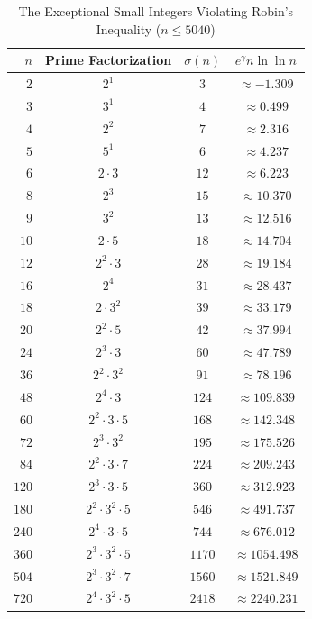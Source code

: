 \documentclass[11pt,a4paper]{article}
\theoremstyle{definition}
\begin{document}
\begin{table}[ht]
\centering
\small
\caption{The Exceptional Small Integers Violating Robin's Inequality ($n \le 5040$)}
\label{tab:robin_exceptions}
\vspace{0.5em}
\begin{tabular}{@{}rccc@{}}
\toprule
$n$ & Prime Factorization & $\sigma(n)$ & $e^\gamma n \ln\ln n$ \\
\midrule
$2$ & $2^1$ & $3$ & $\approx -1.309$ \\
$3$ & $3^1$ & $4$ & $\approx 0.499$ \\
$4$ & $2^2$ & $7$ & $\approx 2.316$ \\
$5$ & $5^1$ & $6$ & $\approx 4.237$ \\
$6$ & $2 \cdot 3$ & $12$ & $\approx 6.223$ \\
$8$ & $2^3$ & $15$ & $\approx 10.370$ \\
$9$ & $3^2$ & $13$ & $\approx 12.516$ \\
$10$ & $2 \cdot 5$ & $18$ & $\approx 14.704$ \\
$12$ & $2^2 \cdot 3$ & $28$ & $\approx 19.184$ \\
$16$ & $2^4$ & $31$ & $\approx 28.437$ \\
$18$ & $2 \cdot 3^2$ & $39$ & $\approx 33.179$ \\
$20$ & $2^2 \cdot 5$ & $42$ & $\approx 37.994$ \\
$24$ & $2^3 \cdot 3$ & $60$ & $\approx 47.789$ \\
$36$ & $2^2 \cdot 3^2$ & $91$ & $\approx 78.196$ \\
$48$ & $2^4 \cdot 3$ & $124$ & $\approx 109.839$ \\
$60$ & $2^2 \cdot 3 \cdot 5$ & $168$ & $\approx 142.348$ \\
$72$ & $2^3 \cdot 3^2$ & $195$ & $\approx 175.526$ \\
$84$ & $2^2 \cdot 3 \cdot 7$ & $224$ & $\approx 209.243$ \\
$120$ & $2^3 \cdot 3 \cdot 5$ & $360$ & $\approx 312.923$ \\
$180$ & $2^2 \cdot 3^2 \cdot 5$ & $546$ & $\approx 491.737$ \\
$240$ & $2^4 \cdot 3 \cdot 5$ & $744$ & $\approx 676.012$ \\
$360$ & $2^3 \cdot 3^2 \cdot 5$ & $1170$ & $\approx 1054.498$ \\
$504$ & $2^3 \cdot 3^2 \cdot 7$ & $1560$ & $\approx 1521.849$ \\
$720$ & $2^4 \cdot 3^2 \cdot 5$ & $2418$ & $\approx 2240.231$ \\

\end{tabular}
\end{table}
\end{document}
